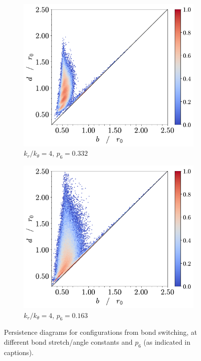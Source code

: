 \begin{figure}[tbp]
        \begin{subfigure}[b]{0.40\textwidth}
         \centering
         \includegraphics[width=\textwidth]{./figures/ph/t_k4_189_bs_pd.pdf}
         \caption{$k_r/k_\theta=4$, $p_6=0.332$}%
         \label{fig:bspdg}
     \end{subfigure}
     \hspace{1cm}
      \begin{subfigure}[b]{0.40\textwidth}
         \centering
         \includegraphics[width=\textwidth]{./figures/ph/t_k4_0_bs_pd.pdf}
         \caption{$k_r/k_\theta=4$, $p_6=0.163$}%
         \label{fig:bspdh}
     \end{subfigure}
     
	\caption{Persistence diagrams for configurations from bond switching, at different bond stretch/angle constants and $p_6$ (as indicated in captions).}
	\label{fig:bspd}
\end{figure}


